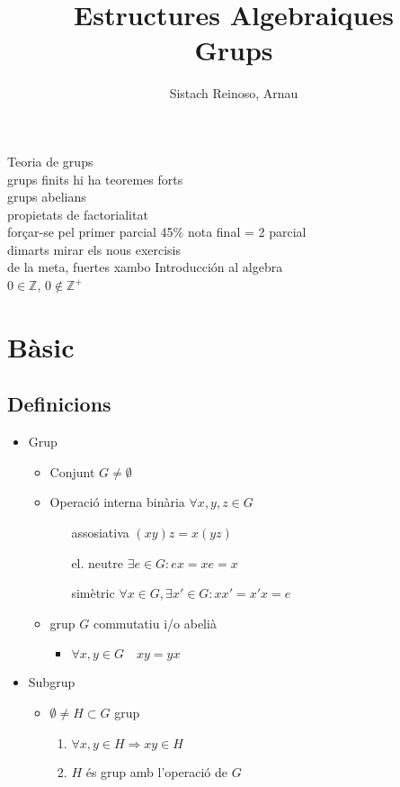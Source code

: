 \documentclass{article}
\title{Estructures Algebraiques\\Grups}
\author{Sistach Reinoso, Arnau}
\newcommand{\Z}{\mathbb{Z}}
\begin{document}
\maketitle
Teoria de grups\\
grups finits hi ha teoremes forts\\
grups abelians\\
propietats de factorialitat\\
forçar-se pel primer parcial 45\% nota final = 2 parcial\\
dimarts mirar els nous exercisis\\
de la meta, fuertes xambo Introducción al algebra\\
$0 \in \Z$,
$0 \notin {\mathbb Z}^+$
\newpage
\tableofcontents
\newpage

\section{Bàsic}
\subsection*{Definicions}
\begin{itemize}
\item Grup
	\begin{itemize}
	\item Conjunt $G \neq \emptyset$
	\item Operació interna binària $\forall x, y, z \in G$
		\begin{enumerate}
		\item[assosiativa] $(xy)z = x(yz) $
		\item[el. neutre] $\exists e \in G: ex = xe = x$
		\item[simètric] $\forall x \in G, \exists x' \in G: xx' = x'x = e$
		\end{enumerate}
	\item grup $G$ commutatiu i/o abelià
		\begin{itemize}
		\item $\forall x, y \in G\quad xy = yx$
		\end{itemize}
	\end{itemize}
\item Subgrup
	\begin{itemize}
	\item $\emptyset \neq H \subset G$ grup
		\begin{enumerate}
		\item $\forall x, y \in H \Rightarrow xy \in H$
		\item $H$ és grup amb l'operació de $G$
		\end{enumerate}
	\end{itemize}
\end{itemize}
\end{document}
